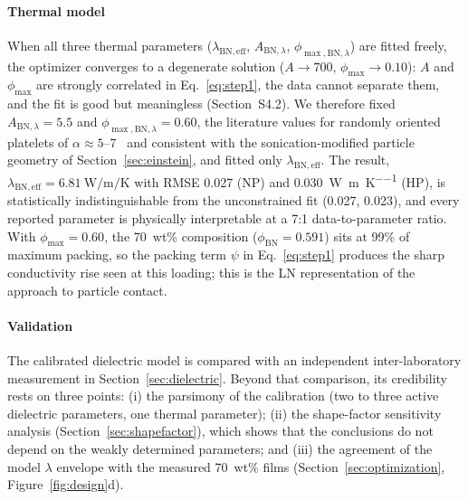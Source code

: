 \documentclass[preprint,a4paper]{elsarticle}
\newcommand{\lam}{\ensuremath{\lambda}}
\newcommand{\phimax}{\ensuremath{\phi_{\max}}}
\newcommand{\phiBN}{\ensuremath{\phi_{\mathrm{BN}}}}
\newcommand{\lamBN}{\ensuremath{\lambda_{\mathrm{BN,eff}}}}
\begin{document}
\paragraph{Thermal model} When all three thermal parameters ($\lamBN$, $A_{\mathrm{BN},\lambda}$, $\phi_{\max,\mathrm{BN},\lambda}$) are fitted freely, the optimizer converges to a degenerate solution ($A \to 700$, $\phimax \to 0.10$): $A$ and \phimax{} are strongly correlated in Eq.~\ref{eq:step1}, the data cannot separate them, and the fit is good but meaningless (Section~S4.2). We therefore fixed $A_{\mathrm{BN},\lambda} = 5.5$ and $\phi_{\max,\mathrm{BN},\lambda} = 0.60$, the literature values for randomly oriented platelets of $\alpha \approx 5$--7~\cite{lewis1970dynamic,nielsen1973thermal,progelhof1976methods} and consistent with the sonication-modified particle geometry of Section~\ref{sec:einstein}, and fitted only \lamBN. The result, $\lamBN = \SI{6.81}{\watt\per\meter\per\kelvin}$ with RMSE 0.027 (NP) and \SI{0.030}{\watt\per\meter\per\kelvin} (HP), is statistically indistinguishable from the unconstrained fit (0.027, 0.023), and every reported parameter is physically interpretable at a 7:1 data-to-parameter ratio. With $\phimax = 0.60$, the 70~wt\% composition ($\phiBN = 0.591$) sits at 99\% of maximum packing, so the packing term $\psi$ in Eq.~\ref{eq:step1} produces the sharp conductivity rise seen at this loading; this is the LN representation of the approach to particle contact.

\paragraph{Validation} The calibrated dielectric model is compared with an independent inter-laboratory measurement in Section~\ref{sec:dielectric}. Beyond that comparison, its credibility rests on three points: (i) the parsimony of the calibration (two to three active dielectric parameters, one thermal parameter); (ii) the shape-factor sensitivity analysis (Section~\ref{sec:shapefactor}), which shows that the conclusions do not depend on the weakly determined parameters; and (iii) the agreement of the model \lam{} envelope with the measured 70~wt\% films (Section~\ref{sec:optimization}, Figure~\ref{fig:design}d).
\end{document}
